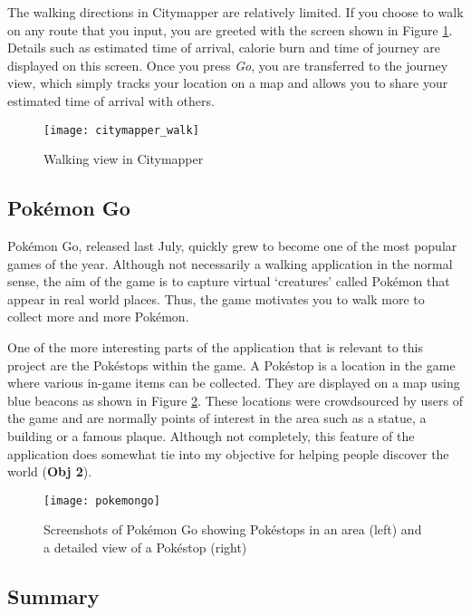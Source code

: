 The walking directions in Citymapper are relatively limited. If you choose to walk on any route that you input, you are greeted with the screen shown in Figure \ref{fig:citymapper-walk}. Details such as estimated time of arrival, calorie burn and time of journey are displayed on this screen. Once you press \textit{Go}, you are transferred to the journey view, which simply tracks your location on a map and allows you to share your estimated time of arrival with others.

\begin{figure}[hbt]
  \centering
  \texttt{[image: citymapper\_walk]}
  \caption{Walking view in Citymapper}
  \label{fig:citymapper-walk}
\end{figure}

\subsection{Pok\'{e}mon Go} \label{subsection:pokemongo}

Pok\'{e}mon Go, released last July, quickly grew to become one of the most popular games of the year. Although not necessarily a walking application in the normal sense, the aim of the game is to capture virtual `creatures' called Pok\'{e}mon that appear in real world places. Thus, the game motivates you to walk more to collect more and more Pok\'{e}mon.

One of the more interesting parts of the application that is relevant to this project are the Pok\'{e}stops within the game. A Pok\'{e}stop is a location in the game where various in-game items can be collected. They are displayed on a map using blue beacons as shown in Figure \ref{fig:pokemongo}. These locations were crowdsourced by users of the game and are normally points of interest in the area such as a statue, a building or a famous plaque. Although not completely, this feature of the application does somewhat tie into my objective for helping people discover the world (\textbf{Obj 2}).

\begin{figure}[hbt]
  \centering
  \texttt{[image: pokemongo]}
  \caption{Screenshots of Pok\'{e}mon Go showing Pok\'{e}stops in an area (left) and a detailed view of a Pok\'{e}stop (right)}
  \label{fig:pokemongo}
\end{figure}

\subsection{Summary}

